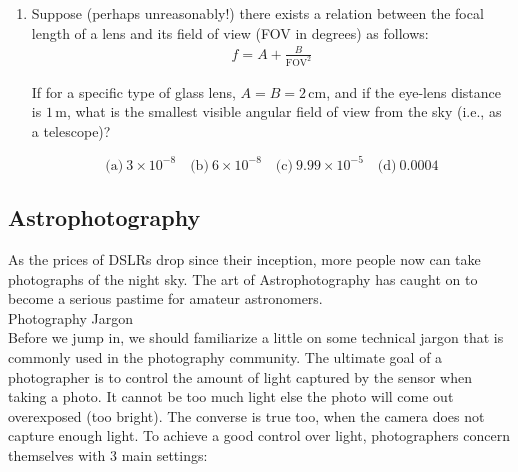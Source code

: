 \documentclass[a4paper,12pt]{extarticle}
\begin{document}
\begin{enumerate}[\textbf{T1.}]
\item Suppose (perhaps unreasonably!) there exists a relation between the focal length of a lens and its field of view (FOV in degrees) as follows:
\begin{align*}
	f = A + \frac{B}{\text{FOV}^2}
\end{align*}

If for a specific type of glass lens, \( A = B = 2 \, \text{cm} \), and if the eye-lens distance is \( 1 \, \text{m} \), what is the smallest visible angular field of view from the sky (i.e., as a telescope)?

\[
\text{(a)} \ 3 \times 10^{-8} \quad 
\text{(b)} \ 6 \times 10^{-8} \quad 
\text{(c)} \ 9.99 \times 10^{-5} \quad 
\text{(d)} \ 0.0004
\]
\end{enumerate}






\clearpage
\subsection{Astrophotography}
As the prices of DSLRs drop since their inception, more people now can take photographs of the night
sky. The art of Astrophotography has caught on to become a serious pastime for amateur astronomers.\\

\textsf{Photography Jargon}\\

Before we jump in, we should familiarize a little on some technical jargon that is commonly used in the
photography community. The ultimate goal of a photographer is to control the amount of light captured by the sensor when taking a photo. It cannot be too much light else the photo will come out overexposed (too bright). The converse is true too, when the camera does not capture enough light.
To achieve a good control over light, photographers concern themselves with 3 main settings:
\end{document}
